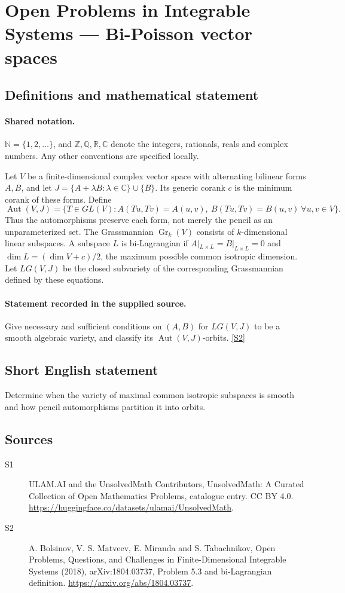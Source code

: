 \documentclass[11pt]{article}
\newcommand{\sref}[2]{\hyperlink{source:#1:#2}{[S#2]}}
\begin{document}
\section{Open Problems in Integrable Systems — Bi-Poisson vector spaces}\label{statement}

\subsection{Definitions and mathematical statement}

\paragraph{Shared notation.}$\mathbb N=\{1,2,\ldots\}$, and $\mathbb Z,\mathbb Q,\mathbb R,\mathbb C$ denote the integers, rationals, reals and complex numbers. Any other conventions are specified locally.


Let $V$ be a finite-dimensional complex vector space with alternating bilinear forms $A,B$, and let $J=\{A+\lambda B:\lambda\in\mathbb C\}\cup\{B\}$. Its generic corank $c$ is the minimum corank of these forms. Define \[\operatorname{Aut}(V,J)=\{T\in GL(V):A(Tu,Tv)=A(u,v),\ B(Tu,Tv)=B(u,v)\ \forall u,v\in V\}.\] Thus the automorphisms preserve each form, not merely the pencil as an unparameterized set. The Grassmannian $\operatorname{Gr}_k(V)$ consists of $k$-dimensional linear subspaces. A subspace $L$ is bi-Lagrangian if $A|_{L\times L}=B|_{L\times L}=0$ and $\dim L=(\dim V+c)/2$, the maximum possible common isotropic dimension. Let $LG(V,J)$ be the closed subvariety of the corresponding Grassmannian defined by these equations.
\paragraph{Statement recorded in the supplied source.}
Give necessary and sufficient conditions on $(A,B)$ for $LG(V,J)$ to be a smooth algebraic variety, and classify its $\operatorname{Aut}(V,J)$-orbits. \sref{statement}{2}
\subsection{Short English statement}
Determine when the variety of maximal common isotropic subspaces is smooth and how pencil automorphisms partition it into orbits.
\subsection{Sources}
\begin{description}
\item[\hypertarget{source:statement:1}{S1}] ULAM.AI and the UnsolvedMath Contributors, UnsolvedMath: A Curated Collection of Open Mathematics Problems, catalogue entry. CC BY 4.0. \url{https://huggingface.co/datasets/ulamai/UnsolvedMath}.
\item[\hypertarget{source:statement:2}{S2}] A. Bolsinov, V. S. Matveev, E. Miranda and S. Tabachnikov, Open Problems, Questions, and Challenges in Finite-Dimensional Integrable Systems (2018), arXiv:1804.03737, Problem 5.3 and bi-Lagrangian definition. \url{https://arxiv.org/abs/1804.03737}.
\end{description}
\label{end:statement}
\end{document}
